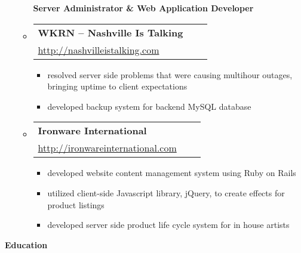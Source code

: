 \documentclass[11pt]{article}
\begin{document}
\begin{itemize}
\begin{itemize}
    \vspace{0.05in}
    \textbf{Server Administrator \& Web Application Developer}
    
    \vspace{0.05in}
  \item \begin{tabular*}{5.65in}{lcr} 
      \textbf{WKRN -- Nashville Is Talking} \\
      \url{http://nashvilleistalking.com} 
    \end{tabular*}
    \begin{itemize}
    \item resolved server side problems that were causing multihour outages, bringing uptime to client expectations
    \item developed backup system for backend MySQL database 
    \end{itemize}
  
  \item \begin{tabular*}{5.65in}{lcr} 
      \textbf{Ironware International} \\
      \url{http://ironwareinternational.com} 
    \end{tabular*}
    \begin{itemize}
    \item developed website content management system using Ruby on Rails
    \item utilized client-side Javascript library, jQuery, to create effects for product listings
    \item developed server side product life cycle system for in house artists
    \end{itemize}
  \end{itemize}
\end{itemize}

\pagebreak
{\large \textbf{Education}}
\end{document}
